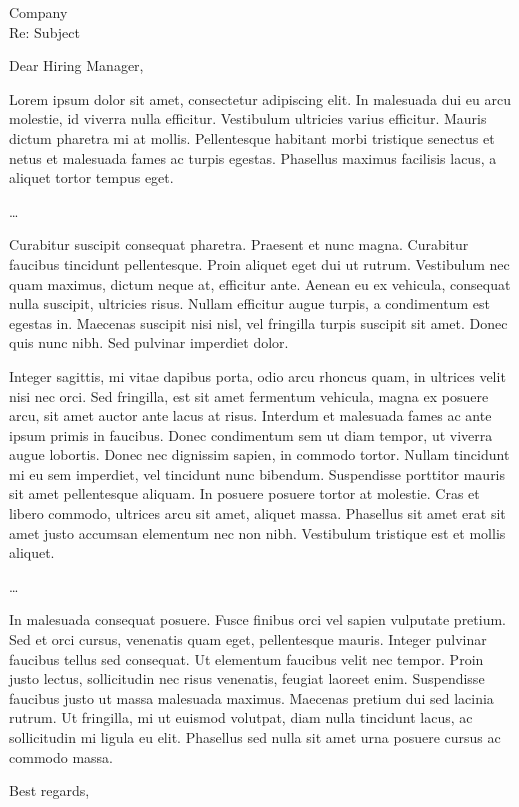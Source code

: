 \documentclass[../cover.tex]{subfiles}
\begin{document}
\begin{letter}
  {Company \\ Re: Subject}
  \signature{\vspace{-4em}Your Name}
  \pagestyle{plain}

  \opening{Dear Hiring Manager,}

  Lorem ipsum dolor sit amet, consectetur adipiscing elit. In malesuada dui eu
  arcu molestie, id viverra nulla efficitur. Vestibulum ultricies varius
  efficitur. Mauris dictum pharetra mi at mollis. Pellentesque habitant morbi
  tristique senectus et netus et malesuada fames ac turpis egestas. Phasellus
  maximus facilisis lacus, a aliquet tortor tempus eget.

  \ldots

  Curabitur suscipit consequat pharetra. Praesent et nunc magna. Curabitur
  faucibus tincidunt pellentesque. Proin aliquet eget dui ut rutrum.
  Vestibulum nec quam maximus, dictum neque at, efficitur ante. Aenean eu ex
  vehicula, consequat nulla suscipit, ultricies risus. Nullam efficitur augue
  turpis, a condimentum est egestas in. Maecenas suscipit nisi nisl, vel
  fringilla turpis suscipit sit amet. Donec quis nunc nibh. Sed pulvinar
  imperdiet dolor.

  Integer sagittis, mi vitae dapibus porta, odio arcu rhoncus quam, in ultrices
  velit nisi nec orci. Sed fringilla, est sit amet fermentum vehicula, magna ex
  posuere arcu, sit amet auctor ante lacus at risus. Interdum et malesuada
  fames ac ante ipsum primis in faucibus. Donec condimentum sem ut diam tempor,
  ut viverra augue lobortis. Donec nec dignissim sapien, in commodo tortor.
  Nullam tincidunt mi eu sem imperdiet, vel tincidunt nunc bibendum.
  Suspendisse porttitor mauris sit amet pellentesque aliquam. In posuere
  posuere tortor at molestie. Cras et libero commodo, ultrices arcu sit amet,
  aliquet massa. Phasellus sit amet erat sit amet justo accumsan elementum nec
  non nibh. Vestibulum tristique est et mollis aliquet.

  \ldots

  In malesuada consequat posuere. Fusce finibus orci vel sapien vulputate
  pretium. Sed et orci cursus, venenatis quam eget, pellentesque mauris.
  Integer pulvinar faucibus tellus sed consequat. Ut elementum faucibus velit
  nec tempor. Proin justo lectus, sollicitudin nec risus venenatis, feugiat
  laoreet enim. Suspendisse faucibus justo ut massa malesuada maximus.
  Maecenas pretium dui sed lacinia rutrum. Ut fringilla, mi ut euismod
  volutpat, diam nulla tincidunt lacus, ac sollicitudin mi ligula eu elit.
  Phasellus sed nulla sit amet urna posuere cursus ac commodo massa.

  \vspace{2em}
  \closing{Best regards,}
\end{letter}
\end{document}
